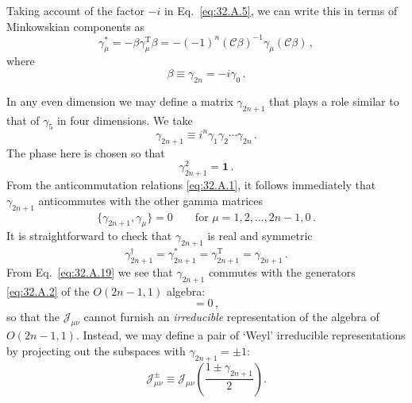 Taking account of the factor \(-i\) in Eq.~\eqref{eq:32.A.5}, we can write
this in terms of Minkow\-skian components as
\begin{equation}
  \gamma_\mu^*
  =-\beta\gamma_\mu^{\mathrm T}\beta
  =-(-1)^n(\mathcal C\beta)^{-1}\gamma_\mu(\mathcal C\beta)\,,
  \tag{32.A.15}\label{eq:32.A.15}
\end{equation}
where
\begin{equation}
  \beta\equiv\gamma_{2n}=-i\gamma_0\,.
  \tag{32.A.16}\label{eq:32.A.16}
\end{equation}

In any even dimension we may define a matrix \(\gamma_{2n+1}\) that plays
a role similar to that of \(\gamma_5\) in four dimensions. We take
\begin{equation}
  \gamma_{2n+1}\equiv i^n\gamma_1\gamma_2\cdots\gamma_{2n}\,.
  \tag{32.A.17}\label{eq:32.A.17}
\end{equation}
The phase here is chosen so that
\begin{equation}
  \gamma_{2n+1}^2=\mathbf{1}\,.
  \tag{32.A.18}\label{eq:32.A.18}
\end{equation}
From the anticommutation relations \eqref{eq:32.A.1}, it follows immediately
that \(\gamma_{2n+1}\) anticommutes with the other gamma matrices
\begin{equation}
  \{\gamma_{2n+1},\gamma_\mu\}=0
  \qquad\text{for \(\mu=1,2,\ldots,2n-1,0\)}\,.
  \tag{32.A.19}\label{eq:32.A.19}
\end{equation}
It is straightforward to check that \(\gamma_{2n+1}\) is real and symmetric
\begin{equation}
  \gamma_{2n+1}^\dagger
  =\gamma_{2n+1}^*
  =\gamma_{2n+1}^{\mathrm T}
  =\gamma_{2n+1}\,.
  \tag{32.A.20}\label{eq:32.A.20}
\end{equation}
From Eq.~\eqref{eq:32.A.19} we see that \(\gamma_{2n+1}\) commutes with the
generators \eqref{eq:32.A.2} of the \(O(2n-1,1)\) algebra:
\begin{equation}
  [\gamma_{2n+1},\mathcal J_{\mu\nu}]=0\,,
  \tag{32.A.21}\label{eq:32.A.21}
\end{equation}
so that the \(\mathcal J_{\mu\nu}\) cannot furnish an \textit{irreducible}
representation of the algebra of \(O(2n-1,1)\). Instead, we may define a
pair of `Weyl' irreducible representations by projecting out the subspaces
with \(\gamma_{2n+1}=\pm1\):
\begin{equation}
  \mathcal J_{\mu\nu}^{\pm}
  \equiv\mathcal J_{\mu\nu}
  \left(\frac{1\pm\gamma_{2n+1}}{2}\right).
  \tag{32.A.22}\label{eq:32.A.22}
\end{equation}
